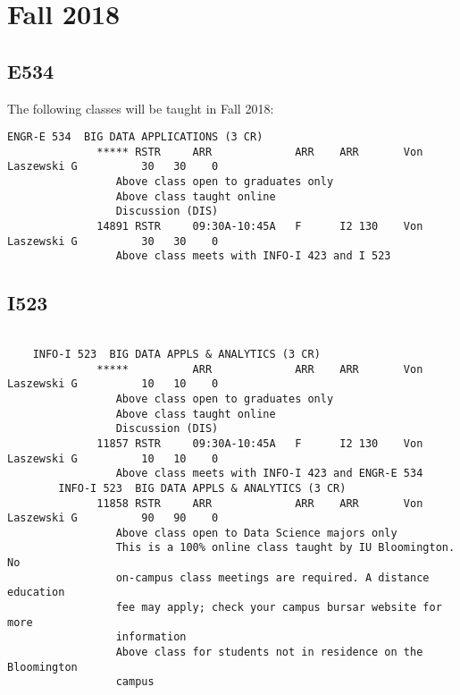 \section{Fall 2018}


\subsection{E534}

The following classes will be taught in Fall 2018:


\begin{verbatim}
ENGR-E 534  BIG DATA APPLICATIONS (3 CR)
              ***** RSTR     ARR             ARR    ARR       Von Laszewski G          30   30    0
                 Above class open to graduates only
                 Above class taught online
                 Discussion (DIS)
              14891 RSTR     09:30A-10:45A   F      I2 130    Von Laszewski G          30   30    0
                 Above class meets with INFO-I 423 and I 523
\end{verbatim}


\subsection{I523}

\begin{verbatim}

	INFO-I 523  BIG DATA APPLS & ANALYTICS (3 CR)
              *****          ARR             ARR    ARR       Von Laszewski G          10   10    0
                 Above class open to graduates only
                 Above class taught online
                 Discussion (DIS)
              11857 RSTR     09:30A-10:45A   F      I2 130    Von Laszewski G          10   10    0
                 Above class meets with INFO-I 423 and ENGR-E 534
        INFO-I 523  BIG DATA APPLS & ANALYTICS (3 CR)
              11858 RSTR     ARR             ARR    ARR       Von Laszewski G          90   90    0
                 Above class open to Data Science majors only
                 This is a 100% online class taught by IU Bloomington. No
                 on-campus class meetings are required. A distance education
                 fee may apply; check your campus bursar website for more
                 information
                 Above class for students not in residence on the Bloomington
                 campus
        
\end{verbatim}

